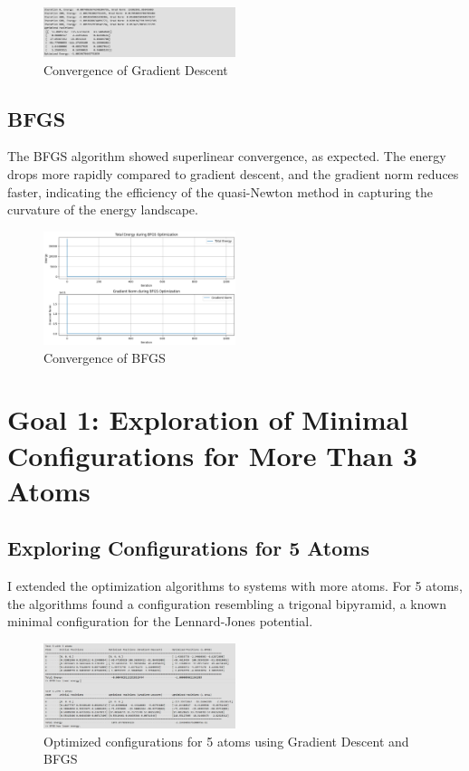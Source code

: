 \documentclass[11pt,onecolumn]{article}
\begin{document}
\begin{figure}[H]
  \includegraphics[width=0.5\textwidth]{descent_convergence.png}
  \centering
  \caption{Convergence of Gradient Descent}
\end{figure}

\subsection*{BFGS}
The BFGS algorithm showed superlinear convergence, as expected. The energy drops more rapidly compared to gradient descent, and the gradient norm reduces faster, indicating the efficiency of the quasi-Newton method in capturing the curvature of the energy landscape.

\begin{figure}[H]
    \includegraphics[width=0.5\textwidth]{bfgs_convergence.png}
    \centering
    \caption{Convergence of BFGS}
\end{figure}

\section*{Goal 1: Exploration of Minimal Configurations for More Than 3 Atoms}

\subsection*{Exploring Configurations for 5 Atoms}
I extended the optimization algorithms to systems with more atoms. For 5 atoms, the algorithms found a configuration resembling a trigonal bipyramid, a known minimal configuration for the Lennard-Jones potential.

\begin{figure}[H]
    \includegraphics[width=0.5\textwidth]{5_atoms_config.png}
    \centering
    \caption{Optimized configurations for 5 atoms using Gradient Descent and BFGS}
\end{figure}
\end{document}
